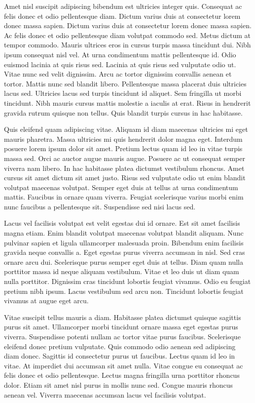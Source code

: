 \documentclass[11pt,a4paper]{article}
\begin{document}
Amet nisl suscipit adipiscing bibendum est ultricies integer quis. Consequat ac felis donec et odio pellentesque diam. Dictum varius duis at consectetur lorem donec massa sapien. Dictum varius duis at consectetur lorem donec massa sapien. Ac felis donec et odio pellentesque diam volutpat commodo sed. Metus dictum at tempor commodo. Mauris ultrices eros in cursus turpis massa tincidunt dui. Nibh ipsum consequat nisl vel. At urna condimentum mattis pellentesque id. Odio euismod lacinia at quis risus sed. Lacinia at quis risus sed vulputate odio ut. Vitae nunc sed velit dignissim. Arcu ac tortor dignissim convallis aenean et tortor. Mattis nunc sed blandit libero. Pellentesque massa placerat duis ultricies lacus sed. Ultricies lacus sed turpis tincidunt id aliquet. Sem fringilla ut morbi tincidunt. Nibh mauris cursus mattis molestie a iaculis at erat. Risus in hendrerit gravida rutrum quisque non tellus. Quis blandit turpis cursus in hac habitasse.

Quis eleifend quam adipiscing vitae. Aliquam id diam maecenas ultricies mi eget mauris pharetra. Massa ultricies mi quis hendrerit dolor magna eget. Interdum posuere lorem ipsum dolor sit amet. Pretium lectus quam id leo in vitae turpis massa sed. Orci ac auctor augue mauris augue. Posuere ac ut consequat semper viverra nam libero. In hac habitasse platea dictumst vestibulum rhoncus. Amet cursus sit amet dictum sit amet justo. Risus sed vulputate odio ut enim blandit volutpat maecenas volutpat. Semper eget duis at tellus at urna condimentum mattis. Faucibus in ornare quam viverra. Feugiat scelerisque varius morbi enim nunc faucibus a pellentesque sit. Suspendisse sed nisi lacus sed.

Lacus vel facilisis volutpat est velit egestas dui id ornare. Est sit amet facilisis magna etiam. Enim blandit volutpat maecenas volutpat blandit aliquam. Nunc pulvinar sapien et ligula ullamcorper malesuada proin. Bibendum enim facilisis gravida neque convallis a. Eget egestas purus viverra accumsan in nisl. Sed cras ornare arcu dui. Scelerisque purus semper eget duis at tellus. Diam quam nulla porttitor massa id neque aliquam vestibulum. Vitae et leo duis ut diam quam nulla porttitor. Dignissim cras tincidunt lobortis feugiat vivamus. Odio eu feugiat pretium nibh ipsum. Lacus vestibulum sed arcu non. Tincidunt lobortis feugiat vivamus at augue eget arcu.

Vitae suscipit tellus mauris a diam. Habitasse platea dictumst quisque sagittis purus sit amet. Ullamcorper morbi tincidunt ornare massa eget egestas purus viverra. Suspendisse potenti nullam ac tortor vitae purus faucibus. Scelerisque eleifend donec pretium vulputate. Quis commodo odio aenean sed adipiscing diam donec. Sagittis id consectetur purus ut faucibus. Lectus quam id leo in vitae. At imperdiet dui accumsan sit amet nulla. Vitae congue eu consequat ac felis donec et odio pellentesque. Lectus magna fringilla urna porttitor rhoncus dolor. Etiam sit amet nisl purus in mollis nunc sed. Congue mauris rhoncus aenean vel. Viverra maecenas accumsan lacus vel facilisis volutpat.
\end{document}
